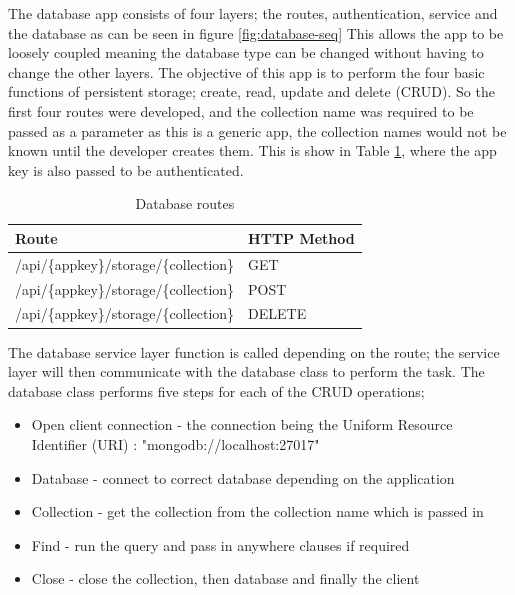 The database app consists of four layers; the routes, authentication, service and the database as can be seen in figure \ref{fig:database-seq} This allows the app to be loosely coupled meaning the database type can be changed without having to change the other layers. The objective of this app is to perform the four basic functions of persistent storage; create, read, update and delete (CRUD). So the first four routes were developed, and the collection name was required to be passed as a parameter as this is a generic app, the collection names would not be known until the developer creates them. This is show in Table \ref{tb:db-routes}, where the app key is also passed to be authenticated. 

\begin{table}[!h]
\centering
\caption{Database routes}
\label{tb:db-routes}
\begin{tabular}{|l|l|}
\hline
\rowcolor{green!20}
Route                                  & HTTP Method \\ \hline
/api/\{appkey\}/storage/\{collection\} & GET         \\ \hline
/api/\{appkey\}/storage/\{collection\} & POST        \\ \hline
/api/\{appkey\}/storage/\{collection\} & DELETE      \\ \hline
\end{tabular}
\end{table}

The database service layer function is called depending on the route; the service layer will then communicate with the database class to perform the task. The database class performs five steps for each of the CRUD operations;

\begin{itemize}
  \item Open client connection
  - the connection being the Uniform Resource Identifier (URI) : "mongodb://localhost:27017" 
  \item Database 
  - connect to correct database depending on the application
  \item Collection
  - get the collection from the collection name which is passed in
  \item Find
  - run the query and pass in anywhere clauses if required
  \item Close
  - close the collection, then database and finally the client
\end{itemize}

